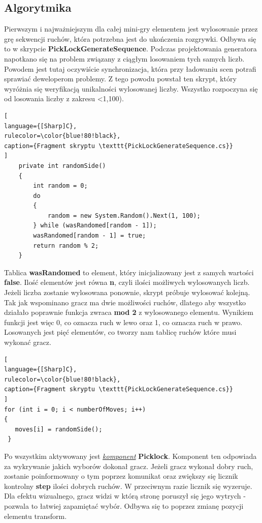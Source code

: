 \documentclass[oneside,polski,logo]{amuthesis}
\begin{document}
\subsection{Algorytmika}
Pierwszym i najważniejszym dla całej mini-gry elementem jest wylosowanie przez grę sekwencji ruchów, która potrzebna jest do ukończenia rozgrywki. Odbywa się to w skrypcie \textbf{PickLockGenerateSequence}. Podczas projektowania generatora napotkano się na problem związany z ciągłym losowaniem tych samych liczb. Powodem jest tutaj oczywiście synchronizacja, która przy ładowaniu scen potrafi sprawiać deweloperom problemy. Z tego powodu powstał ten skrypt, który wyróżnia się weryfikacją unikalności wylosowanej liczby.
Wszystko rozpoczyna się od losowania liczby z zakresu <1,100).
\begin{lstlisting}[
language={[Sharp]C},
rulecolor=\color{blue!80!black},
caption={Fragment skryptu \texttt{PickLockGenerateSequence.cs}}
]
    private int randomSide()
    {
        int random = 0;
        do
        {
            random = new System.Random().Next(1, 100);
        } while (wasRandomed[random - 1]);
        wasRandomed[random - 1] = true;
        return random % 2;
    }
\end{lstlisting}
Tablica \textbf{wasRandomed} to element, który inicjalizowany jest z samych wartości \textbf{false}. Ilość elementów jest równa \textbf{n}, czyli ilości możliwych wylosowanych liczb. Jeżeli liczba zostanie wylosowana ponownie, skrypt próbuje wylosować kolejną. Tak jak wspominano gracz ma dwie możliwości ruchów, dlatego aby wszystko działało poprawnie funkcja zwraca \textbf{mod 2} z wylosowanego elementu. Wynikiem funkcji jest więc 0, co oznacza ruch w lewo oraz 1, co oznacza ruch w prawo. Losowanych jest pięć elementów, co tworzy nam tablicę ruchów które musi wykonać gracz.
\begin{lstlisting}[
language={[Sharp]C},
rulecolor=\color{blue!80!black},
caption={Fragment skryptu \texttt{PickLockGenerateSequence.cs}}
]
for (int i = 0; i < numberOfMoves; i++)
{
   moves[i] = randomSide();
 }
\end{lstlisting}
Po wszystkim aktywowany jest \hyperref[sec:komponent]{\emph{komponent}} \textbf{Picklock}. Komponent ten odpowiada za wykrywanie jakich wyborów dokonał gracz. Jeżeli gracz wykonał dobry ruch, zostanie poinformowany o tym poprzez komunikat oraz zwiększy się licznik kontrolny \textbf{step} ilości dobrych ruchów. W przeciwnym razie licznik się wyzeruje. Dla efektu wizualnego, gracz widzi w którą stronę poruszył się jego wytrych - pozwala to łatwiej zapamiętać wybór. Odbywa się to poprzez zmianę pozycji elementu transform.
\end{document}
